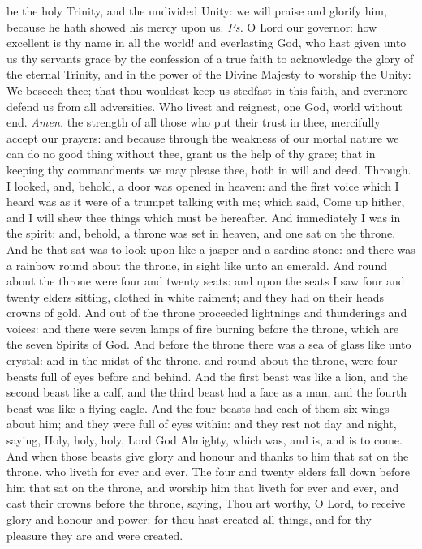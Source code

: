 \introit
{} be the holy Trinity, and the undivided Unity: we will praise and glorify him, because he hath showed his mercy upon us. \textit{Ps.} O Lord our governor: how excellent is thy name in all the world!
\collect
{} and everlasting God, who hast given unto us thy servants grace by the confession of a true faith to acknowledge the glory of the eternal Trinity, and in the power of the Divine Majesty to worship the Unity: We beseech thee; that thou wouldest keep us stedfast in this faith, and evermore defend us from all adversities. Who livest and reignest, one God, world without end. \textit{Amen.}
 the strength of all those who put their trust in thee, mercifully accept our prayers: and because through the weakness of our mortal nature we can do no good thing without thee, grant us the help of thy grace; that in keeping thy commandments we may please thee, both in will and deed. Through.
\vspace{-0.5ex}
 I looked, and, behold, a door was opened in heaven: and the first voice which I heard was as it were of a trumpet talking with me; which said, Come up hither, and I will shew thee things which must be hereafter. And immediately I was in the spirit: and, behold, a throne was set in heaven, and one sat on the throne. And he that sat was to look upon like a jasper and a sardine stone: and there was a rainbow round about the throne, in sight like unto an emerald. And round about the throne were four and twenty seats: and upon the seats I saw four and twenty elders sitting, clothed in white raiment; and they had on their heads crowns of gold. And out of the throne proceeded lightnings and thunderings and voices: and there were seven lamps of fire burning before the throne, which are the seven Spirits of God. And before the throne there was a sea of glass like unto crystal: and in the midst of the throne, and round about the throne, were four beasts full of eyes before and behind. And the first beast was like a lion, and the second beast like a calf, and the third beast had a face as a man, and the fourth beast was like a flying eagle. And the four beasts had each of them six wings about him; and they were full of eyes within: and they rest not day and night, saying, Holy, holy, holy, Lord God Almighty, which was, and is, and is to come. And when those beasts give glory and honour and thanks to him that sat on the throne, who liveth for ever and ever, The four and twenty elders fall down before him that sat on the throne, and worship him that liveth for ever and ever, and cast their crowns before the throne, saying, Thou art worthy, O Lord, to receive glory and honour and power: for thou hast created all things, and for thy pleasure they are and were created.

